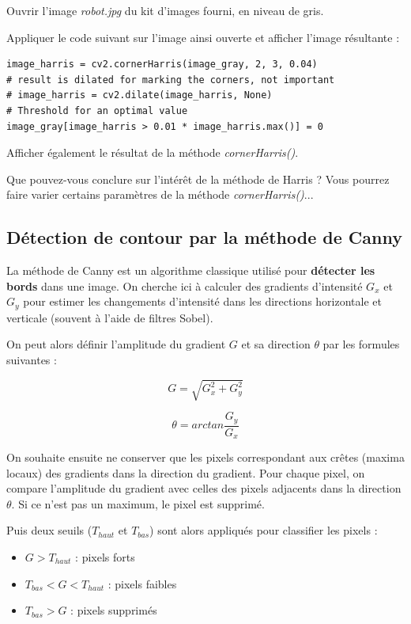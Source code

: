 \documentclass[a4paper,11pt,titlepage]{article} %
\begin{document}
\medskip

\Manip Ouvrir l'image \textsl{robot.jpg} du kit d'images fourni, en niveau de gris. 

\Manip Appliquer le code suivant sur l'image ainsi ouverte et afficher l'image résultante :

\begin{lstlisting}
image_harris = cv2.cornerHarris(image_gray, 2, 3, 0.04)
# result is dilated for marking the corners, not important
# image_harris = cv2.dilate(image_harris, None)
# Threshold for an optimal value
image_gray[image_harris > 0.01 * image_harris.max()] = 0
\end{lstlisting}

\Manip Afficher également le résultat de la méthode \textsl{cornerHarris()}.

\Quest Que pouvez-vous conclure sur l'intérêt de la méthode de Harris ? Vous pourrez faire varier certains paramètres de la méthode \textsl{cornerHarris()}...


\subsection{Détection de contour par la méthode de Canny}

La méthode de Canny est un algorithme classique utilisé pour \textbf{détecter les bords} dans une image. On cherche ici à calculer des gradients d'intensité $G_x$ et $G_y$ pour estimer les changements d'intensité dans les directions horizontale et verticale (souvent à l'aide de filtres Sobel).

On peut alors définir l'amplitude du gradient $G$ et sa direction $\theta$ par les formules suivantes : 

$$G = \sqrt{G_x^2 + G_y^2}$$

$$\theta = arctan \frac{G_y}{G_x}$$

 
On souhaite ensuite ne conserver que les pixels correspondant aux crêtes (maxima locaux) des gradients dans la direction du gradient. Pour chaque pixel, on compare l'amplitude du gradient avec celles des pixels adjacents dans la direction $\theta$. Si ce n'est pas un maximum, le pixel est supprimé.

Puis deux seuils ($T_{haut}$ et $T_{bas}$) sont alors appliqués pour classifier les pixels :

\begin{itemize}
	\item $G > T_{haut}$ : pixels forts
	\item $T_{bas} < G < T_{haut}$ : pixels faibles
	\item $T_{bas} > G$ : pixels supprimés
\end{itemize}
\end{document}
